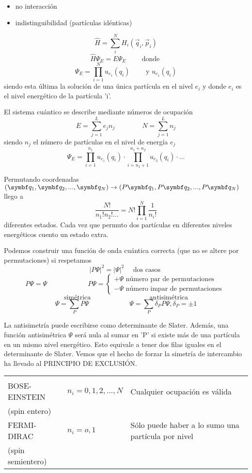 \documentclass[10pt,oneside]{CBFT_book}
\begin{document}
\begin{itemize}
 \item no interacción
 \item indistinguibilidad (partículas idénticas)
\end{itemize}

\[
	\hat{H} = \sum_i^N H_i (\vec{q}_i , \vec{p}_i )
\]
\[
	\hat{H} \Psi_E = E \Psi_E \qquad \text{ donde }
\]
\[
	\Psi_E = \prod_{i=1}^{N} u_{e_1}(q_i) \qquad \text{ y } u_{e_1}(q_i)
\]
siendo esta última la solución de una única partícula en el nivel $e_i$ 
y donde $e_i$ es el nivel energético de la partícula 'i'.

El sistema cuántico se describe mediante números de ocupación
\[
	E = \sum_{j=1}^L e_j n_j  \qquad \qquad  N = \sum_{j=1}^L  n_j
\]
siendo $n_j$ el número de partículas en el nivel de energía $e_j$ 
\[
	\Psi_E = \prod_{i=1}^{n_1} u_{e_1}(q_i) \cdot \prod_{i = n_1 + 1 }^{ n_1 + n_2 } u_{e_2}(q_i) \cdot ...
\]

Permutando coordenadas $(\vb{q}_1,\vb{q}_2,...,\vb{q}_N ) \to (P\vb{q}_1,P\vb{q}_2,...,P\vb{q}_N)$ llego a
\[
	\frac{N!}{n_1!n_2!...} = N! \prod_{i=1}^N \frac{1}{n_i!}
\]
diferentes estados. Cada vez que permuto dos partículas en diferentes niveles energéticos cuento un estado extra.

Podemos construir una función de onda cuántica correcta (que no se altere por permutaciones) si respetamos
\[
	| P\Psi |^2 = | \Psi |^2 \quad \text{ dos casos }
\]
\[
	P\Psi = \Psi \qquad \qquad \qquad P\Psi = 
	\begin{cases}
	+ \Psi \text{ número par de permutaciones } \\ 
	- \Psi \text{ número impar de permutaciones } 
	\end{cases}
\]
\[
	\text{ simétrica } \qquad \qquad \qquad \qquad \text{ antisimétrica } 
\]
\[
	\Psi = \sum_P P\Psi \qquad \qquad \qquad \Psi = \sum_P \delta_P P\Psi, \delta_P = \pm 1
\]

La antisimetría puede escribirse como determinante de Slater. Además, una función antisimétrica $\Psi$ será nula 
al sumar en 'P' si existe más de una partícula en un mismo nivel energético. Esto equivale a tener dos filas
iguales en el determinante de Slater.
Vemos que el hecho de forzar la simetría de intercambio ha llevado al PRINCIPIO DE EXCLUSIÓN.

\begin{center}
\begin{tabular}{|l|l|l|}
\hline
 & & \\
BOSE-EINSTEIN & $ n_i = 0,1,2, ... , N $ & Cualquier ocupación es válida \\
 (spin entero) & & \\
FERMI-DIRAC  & $ n_i = o, 1 $ & Sólo puede haber a lo sumo una partícula por nivel \\
 (spin semientero) & & \\
\hline
\end{tabular}
\end{center}
\end{document}

